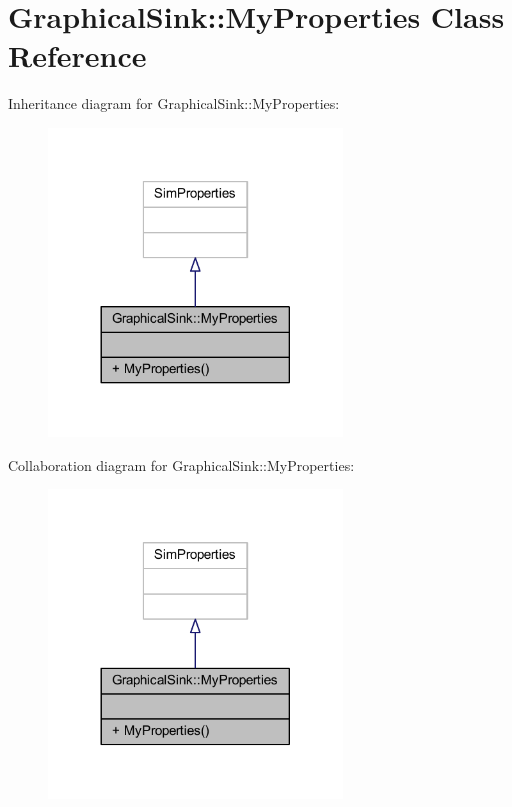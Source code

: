 \hypertarget{class_graphical_sink_1_1_my_properties}{}\section{Graphical\+Sink\+:\+:My\+Properties Class Reference}
\label{class_graphical_sink_1_1_my_properties}


Inheritance diagram for Graphical\+Sink\+:\+:My\+Properties\+:
\nopagebreak
\begin{figure}[H]
\begin{center}
\leavevmode
\includegraphics[width=221pt]{class_graphical_sink_1_1_my_properties__inherit__graph}
\end{center}
\end{figure}


Collaboration diagram for Graphical\+Sink\+:\+:My\+Properties\+:
\nopagebreak
\begin{figure}[H]
\begin{center}
\leavevmode
\includegraphics[width=221pt]{class_graphical_sink_1_1_my_properties__coll__graph}
\end{center}
\end{figure}
